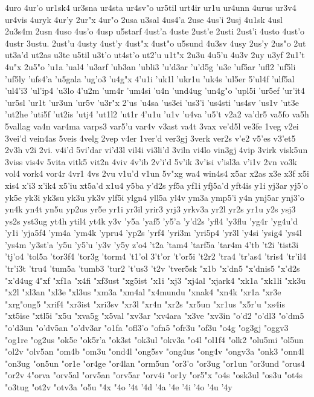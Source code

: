 {4uro
4ur'o
ur1sk4
ur3sna
ur4sta
ur4sv"o
ur5til
urt4ir
ur1u
ur4unn
4urus
ur3v4
ur4vis
4uryk
4ur'y
2ur"x
4ur"o
2usa
u3sal
4us4'a
2use
4us'i
2usj
4u1sk
4usl
2u3s4m
2usn
4uso
4us'o
4usp
u5starf
4ust'a
4uste
2ust'e
2usti
2ust'i
4usto
4ust'o
4ustr
3ustu.
2ust'u
4usty
4ust'y
4ust"x
4ust"o
u5sund
4u3sv
4usy
2us'y
2us"o
2ut
ut3a'd
ut2as
u3te
u5til
u3t'o
ut4st'o
ut2'u
u1t"x
2u3u
4u5'u
4u3v
2uy
u3yf
2u1't
4u"x
2u5"o
'u1a
'ual4
'u3arf
'ub3an
'ubli3
'u'd3ar
'u'd5g
'u3e
'uf5ar
'ufl2
'uf5li
'uf5ly
'ufs4'a
'u5gala
'ug'o3
'u4g"x
4'u1i
'uk1l
'ukr1u
'uk4s
'ul5er
5'ul4f
'ulf5al
'ul4'i3
'ul'ip4
'u3lo
4'u2m
'um4r
'um4si
'u4n
'und4ug
'un4g"o
'upl5i
'ur5ef
'ur'it4
'ur5sl
'ur1t
'ur3un
'ur5v
'u3r"x
2'us
'u4sa
'us3ei
'us3'i
'us4sti
'us4sv
'us1v
'ut3e
'ut2he
'uti5f
'ut2is
'utj4
'ut1l2
'ut1r
4'u1u
'u1v
'u4va
'u5't
v2a2
va'dr5
va5fo
va5h
5vallag
va4n
var4ma
varps3
var5'u
var4v
v3ast
va4t
3vax
ve'd5l
ve3fe
1veg
v2ei
3vei'd
vein4as
5veis
4velg
2vep
v4er
1ver'd
ver3gj
3verk
ver2s
v'e2
v5'es
v3'et5
2v3h
v2i
2vi.
v4i'd
5vi'dar
vi'd3l
vil4i
vi3li'd
3viln
vi4lo
vin3gj
4vip
3virk
visk5un
3viss
vis4v
5vita
vitk5
vit2n
4viv
4v'ib
2v'i'd
5v'ik
3v'isi
v'isl3a
v'i1v
2vn
vo3k
vol4
vork4
vor4r
4vr1
4vs
2vu
v1u'd
v1un
5v"xg
wa4
win4s4
x5ar
x2as
x3e
x3f
x5i
xis4
x'i3
x'ik4
x5'iu
xt5a'd
x1u4
y5ba
y'd2s
yf5a
yf1i
yfj5a'd
yft4is
y1i
yj3ar
yj5'o
yk5e
yk3i
yk3su
yk3u
yk3v
ylf5i
ylgn4
yll5a
yl4v
ym3a
ymp5'i
y4n
ynj5ar
ynj3'o
yn4k
yn4t
yn5u
yp2us
yr5e
yr1i
yr3il
yrir3
yrj3
yrkv3a
yr2l
yr2s
yr1u
y2s
ysj3
ys2s
yst3ug
yt4h
ytil4
yt4k
y3v
'y5a
'yaf5
'y5'a
'y'd2s
'yfl4
'y3flu
'yg4r
'yg4u'd
'y1i
'yja5f4
'ym4a
'ym4k
'ypru4
'yp2s
'yrf4
'yri3m
'yri5p4
'yr3l
'y4si
'ysig4
'ys4l
'ys4m
'y3st'a
'y5u
'y5'u
'y3v
'y5y
z'o4
't2a
'tam4
'tarf5a
'tar4m
4'tb
't2i
'tist3i
'tj'o4
'tol5a
'tor3f4
'tor3g
'torm4
't1'ol
3't'or
't'or5i
't2r2
'tra4
'tr'as4
'tris4
'tr'il4
'tr'i3t
'tru4
'tum5a
'tumb3
'tur2
't'us3
't2v
'tver5sk
"x1b
"x'dn5
"x'dnis5
"x'd2s
"x'd4ug
4"xf
"xf1a
"x4fi
"xf3ust
"xg5ist
"x1i
"xj3
"xj4al
"xjark4
"xk1a
"xk1li
"xk3u
"x2l
"xl3an
"xl3e
"xl3us
"xm3a
"xm4al
"x4mundu
"xnak4
"xn4k
"xr1a
"xr3e
"xrg"ong5
"xrif4
"xr3ist
"xri3sv
"xr3l
"xr4n
"xr2s
"xr5un
"xr1us
"x5r'u
"xs4is
"xt5ise
"xtl5i
"x5u
"xva5g
"x5val
"xv3ar
"xv4ara
"x3ve
"xv3in
"o'd2
"o'dl3
"o'dm5
"o'd3un
"o'dv5an
"o'dv3ar
"o1fa
"ofl3'o
"ofn5
"ofr3u
"of3u
"o4g
"og3gj
"oggv3
"og1re
"og2us
"ok5e
"ok5r'a
"ok3st
"ok3ul
"okv3a
"o4l
"ol1f4
"olk2
"olu5mi
"ol5un
"ol2v
"olv5an
"om4b
"om3u
"ond4l
"ong5sv
"ong4us
"ong4v
"ongv3a
"onk3
"onn4l
"on3ug
"on5un
"or1e
"or4ge
"or4lan
"orm5un
"or3'o
"or3ug
"or1un
"or3und
"orus4
"or2v
4"orva
"orv5al
"orv5an
"orv5ar
"orv4i
"or1y
"or5"x
"o4s
"osk3ul
"os3u
"ot4s
"o3tug
"ot2v
"otv3a
"o5u
"4x
"4o
'4t
'4d
'4a
'4e
'4i
'4o
'4u
'4y
}
